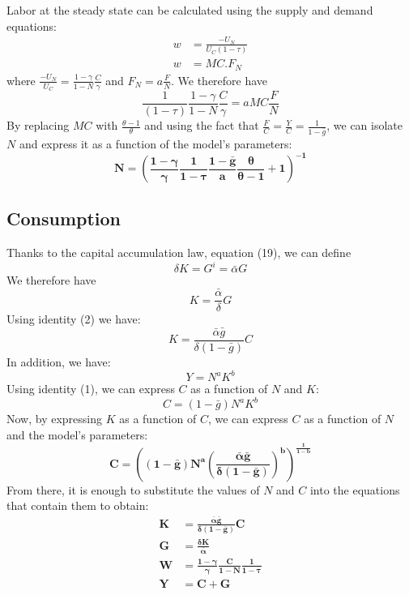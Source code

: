 \documentclass[12pt,letterpaper]{article}
\newcommand{\gbar}{\bar{g}}
\newcommand{\abar}{\bar{\alpha}}
\begin{document}
Labor at the steady state can be calculated using the supply and demand equations:
\begin{align*}
w &= \frac{-U_N}{U_C(1-\tau)}\\
w &= MC.F_N
\end{align*}
where $\frac{-U_N}{U_C} = \frac{1-\gamma}{1-N}\frac{C}{\gamma}$ and $F_N = a\frac{F}{N}$. We therefore have
\begin{equation*}
\frac{1}{(1-\tau)}\frac{1-\gamma}{1-N}\frac{C}{\gamma} = aMC\frac{F}{N}
\end{equation*}
By replacing $MC$ with $\frac{\theta-1}{\theta}$ and using the fact that $\frac{F}{C} = \frac{Y}{C} = \frac{1}{1-\gbar}$, we can isolate $N$ and express it as a function of the model's parameters:
\begin{equation*}
\boldsymbol{N = \left(\frac{1-\gamma}{\gamma}\frac{1}{1-\tau}\frac{1-\gbar}{a}\frac{\theta}{\theta-1} + 1\right)^{-1}}
\end{equation*}

\subsection*{Consumption}

Thanks to the capital accumulation law, equation (19), we can define
\begin{equation*}
\delta K = G^i = \abar G
\end{equation*}
We therefore have
\begin{equation*}
K = \frac{\abar}{\delta}G
\end{equation*}
Using identity (2) we have:
\begin{equation*}
K = \frac{\abar\gbar}{\delta(1-\gbar)}C
\end{equation*}
In addition, we have:
\begin{equation*}
Y = N^a K^b
\end{equation*}
Using identity (1), we can express $C$ as a function of $N$ and $K$:
\begin{equation*}
C = (1-\gbar)N^a K^b
\end{equation*}
Now, by expressing $K$ as a function of $C$, we can express $C$ as a function of $N$ and the model's parameters:
\begin{equation*}
\boldsymbol{C = \left((1-\gbar)N^a\left(\frac{\abar\gbar}{\delta(1-\gbar)}\right)^b\right)^{\frac{1}{1-b}}}
\end{equation*}
From there, it is enough to substitute the values of $N$ and $C$ into the equations that contain them to obtain:
\begin{align*}
\boldsymbol{K} &\boldsymbol{= \frac{\abar\gbar}{\delta(1-\gbar)}C}\\
\boldsymbol{G} &\boldsymbol{= \frac{\delta K}{\abar}}\\
\boldsymbol{W} &\boldsymbol{= \frac{1-\gamma}{\gamma}\frac{C}{1-N}\frac{1}{1-\tau}}\\
\boldsymbol{Y} &\boldsymbol{= C+G}
\end{align*}
\end{document}
